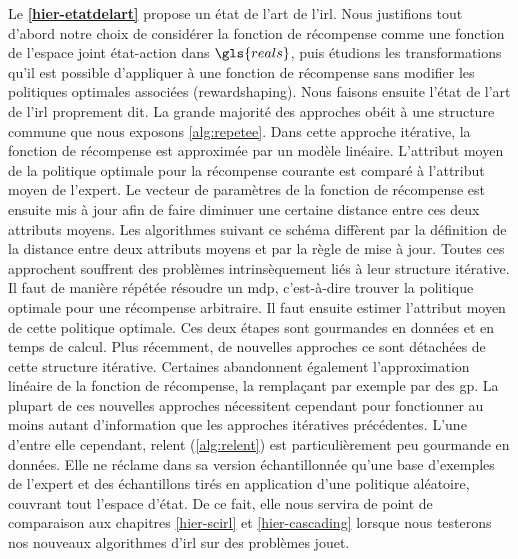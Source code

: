 \documentclass[frenchb,a4paper,justified,notoc]{tufte-book}
\newcommand{\reals}{\gls{reals}}
\begin{document}
Le \textbf{\autoref{hier-etatdelart}} propose un état de l'art de l'\gls{irl}. Nous justifions tout d'abord notre choix de considérer la fonction de récompense comme une fonction de l'espace joint état-action dans $\reals$, puis étudions les transformations qu'il est possible d'appliquer à une fonction de récompense sans modifier les politiques optimales associées (\gls{rewardshaping}). Nous faisons ensuite l'état de l'art de l'\gls{irl} proprement dit. La grande majorité des approches obéit à une structure commune que nous exposons \autoref{alg:repetee}. Dans cette approche itérative, la fonction de récompense est approximée par un modèle linéaire. L'attribut moyen de la politique optimale pour la récompense courante est comparé à l'attribut moyen de l'expert. Le vecteur de paramètres de la fonction de récompense est ensuite mis à jour afin de faire diminuer une certaine distance entre ces deux attributs moyens. Les algorithmes suivant ce schéma diffèrent par la définition de la distance entre deux attributs moyens et par la règle de mise à jour. Toutes ces approchent souffrent des problèmes intrinsèquement liés à leur structure itérative. Il faut de manière répétée résoudre un \gls{mdp}, c'est-à-dire trouver la politique optimale pour une récompense arbitraire. Il faut ensuite estimer l'attribut moyen de cette politique optimale. Ces deux étapes sont gourmandes en données et en temps de calcul. Plus récemment, de nouvelles approches ce sont détachées de cette structure itérative. Certaines abandonnent également l'approximation linéaire de la fonction de récompense, la remplaçant par exemple par des \gls{gp}. La plupart de ces nouvelles approches nécessitent cependant pour fonctionner au moins autant d'information que les approches itératives précédentes. L'une d'entre elle cependant, \gls{relent} (\autoref{alg:relent}) est particulièrement peu gourmande en données. Elle ne réclame dans sa version échantillonnée qu'une base d'exemples de l'expert et des échantillons tirés en application d'une politique aléatoire, couvrant tout l'espace d'état. De ce fait, elle nous servira de point de comparaison aux chapitres \ref{hier-scirl} et \ref{hier-cascading} lorsque nous testerons nos nouveaux algorithmes d'\gls{irl} sur des problèmes jouet.
\end{document}
